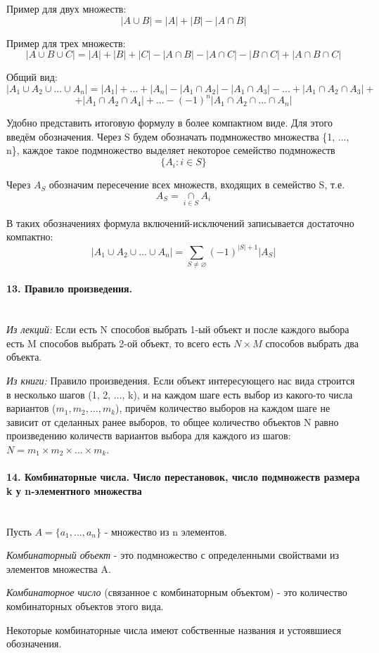 \documentclass[a4paper, 12pt]{article}
\newcommand{\parag}[1]{\paragraph{#1}\mbox{}\\}
\begin{document}
Пример для двух множеств:
\[  |A \cup B| = |A| + |B| - |A \cap B| \]

Пример для трех множеств:
\[ |A \cup B \cup C| = |A| + |B| + |C| - |A \cap B| - |A \cap C| - |B \cap C| + |A \cap B \cap C| \]

Общий вид:
\[ |A_{1} \cup A_{2} \cup ... \cup A_{n}| = |A_{1}| + ... + |A_{n}| - |A_{1} \cap A_{2}| - |A_{1} \cap A_{3}| - ... + |A_{1} \cap A_{2} \cap A_{3}|+ \]
\[  + |A_{1} \cap A_{2} \cap A_{4}| + ... - (-1)^{n}|A_{1} \cap A_{2} \cap ... \cap A_{n}| \]

\noindent
Удобно представить итоговую формулу в более компактном виде. Для этого введём обозначения. Через S будем обозначать подмножество множества \{1, ..., n\}, каждое такое подмножество выделяет некоторое семейство подмножеств $$\{A_{i}
: i \in S\}$$

\noindent
Через $A_{S}$ обозначим пересечение всех множеств, входящих в семейство S, т.е.
$$ A_{S} = \underset{i \in S}{\cap}A_{i} $$

\noindent
В таких обозначениях формула включений-исключений записывается достаточно компактно:
$$ |A_{1} \cup A_{2} \cup ... \cup A_{n}| = \underset{S \neq \varnothing}{\sum} (-1)^{|S|+1}|A_{S}| $$

\parag{13. Правило произведения.}
\textit{Из лекций:} Если есть N способов выбрать 1-ый объект и после каждого выбора есть M способов выбрать 2-ой объект, то всего есть $N \times M$ способов выбрать два объекта.

\noindent
\textit{Из книги:} Правило произведения. Если объект интересующего нас вида строится в несколько шагов (1, 2, ..., k), и на каждом шаге есть выбор из какого-то числа вариантов ($m_{1}, m_{2}, . . . , m_{k}$), причём количество выборов на каждом шаге не зависит от сделанных ранее выборов, то общее количество объектов N равно произведению количеств вариантов выбора для
каждого из шагов: $N = m_{1} \times m_{2} \times ... \times m_{k}$.

\parag{14. Комбинаторные числа. Число перестановок, число подмножеств размера k у n-элементного множества}
Пусть $A = \{a_{1}, ..., a_{n}\}$ - множество из n элементов. 

\noindent
\textit{Комбинаторный объект} - это подмножество с определенными свойствами из элементов множества A. 

\noindent
\textit{Комбинаторное число} (связанное с комбинаторным объектом) - это количество комбинаторных объектов этого вида.

\noindent
Некоторые комбинаторные числа имеют собственные названия и устоявшиеся обозначения.
\end{document}

